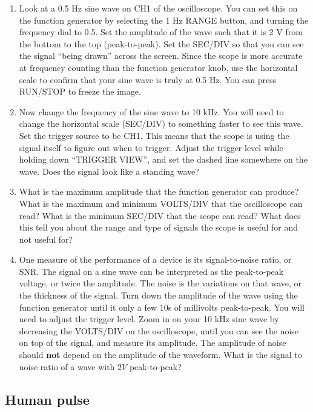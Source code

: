 \begin{enumerate}
\item Look at a 0.5 Hz sine wave on CH1 of the oscilloscope. You can set this on the function generator by selecting the 1 Hz RANGE button, and turning the frequency dial to 0.5. Set the amplitude of the wave such that it is 2 V from the bottom to the top (peak-to-peak). Set the SEC/DIV so that you can see the signal ``being drawn'' across the screen. Since the scope is more accurate at frequency counting than the function generator knob, use the horizontal scale to confirm that your sine wave is truly at 0.5 Hz. You can press RUN/STOP to freeze the image.

\item Now change the frequency of the sine wave to 10 kHz. You will need to change the horizontal scale (SEC/DIV) to something faster to see this wave. Set the trigger source to be CH1. This means that the scope is using the signal itself to figure out when to trigger. Adjust the trigger level while holding down ``TRIGGER VIEW'', and set the dashed line somewhere on the wave. Does the signal look like a standing wave? 

\item What is the maximum amplitude that the function generator can produce? What is the maximum and minimum VOLTS/DIV that the oscilloscope can read? What is the minimum SEC/DIV that the scope can read? What does this tell you about the range and type of signals the scope is useful for and not useful for?

\item One measure of the performance of a device is its signal-to-noise ratio, or SNR. The signal on a sine wave can be interpreted as the peak-to-peak voltage, or twice the amplitude. The noise is the variations on that wave, or the thickness of the signal. Turn down the amplitude of the wave using the function generator until it only a few 10s of millivolts peak-to-peak. You will need to adjust the trigger level. Zoom in on your 10 kHz sine wave by decreasing the VOLTS/DIV on the oscilloscope, until you can see the noise on top of the signal, and measure its amplitude. The amplitude of noise should {\bf{not}} depend on the amplitude of the waveform. What is the signal to noise ratio of a wave with $2V$ peak-to-peak?
 
\end{enumerate}

\subsection{Human pulse}

